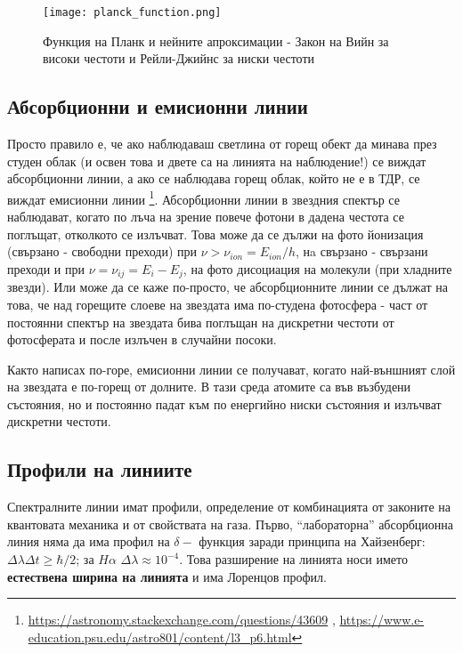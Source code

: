 \documentclass[a4paper,12pt]{article}
\let\oldAA\AA
\renewcommand{\AA}{\text{\normalfont\oldAA}}
\begin{document}
 
\begin{figure}[h!]
\centering
\texttt{[image: planck\_function.png]}
\caption{Функция на Планк и нейните апроксимации - Закон на Вийн за високи честоти и Рейли-Джийнс за ниски честоти}
\label{fig:planck_function}
\end{figure}

 
 \subsection{Абсорбционни и емисионни линии}

Просто правило е, че ако наблюдаваш светлина от горещ обект да минава през студен облак (и освен това и двете са на линията на наблюдение!) се виждат абсорбционни линии, а ако се наблюдава горещ облак, който не е в ТДР, се виждат емисионни линии \footnote{\url{https://astronomy.stackexchange.com/questions/43609} , \url{https://www.e-education.psu.edu/astro801/content/l3_p6.html}}. Абсорбционни линии в звездния спектър се наблюдават, когато по лъча на зрение повече фотони в дадена честота се поглъщат, отколкото се излъчват. Това може да се дължи на фото йонизация (свързано - свободни преходи) при $\nu > \nu_{ion} = E_{ion}/h$, нa свързано - свързани преходи и при $\nu = \nu_{ij}=E_i - E_j$, на фото дисоциация на молекули (при хладните звезди). Или може да се каже по-просто, че абсорбционните линии се дължат на това, че над горещите слоеве на звездата има по-студена фотосфера - част от постоянни спектър на звездата бива поглъщан на дискретни честоти от фотосферата и после излъчен в случайни посоки.

Както написах по-горе, емисионни линии се получават, когато най-външният слой на звездата е по-горещ от долните. В тази среда атомите са във възбудени състояния, но и постоянно падат към по енергийно ниски състояния и излъчват дискретни честоти.

\subsection{Профили на линиите}

 Спектралните линии имат профили, определение от комбинацията от законите на квантовата механика и от свойствата на газа. Първо, ``лабораторна'' абсорбционна линия няма да има профил на $\delta-$ функция заради принципа на Хайзенберг: $\Delta \lambda \Delta t \geq \hbar / 2$;  за $H \alpha$ $\Delta \lambda \approx 10^{-4}$\AA.  Това разширение на линията носи името \textbf{ естествена ширина на линията} и има Лоренцов профил.
\end{document}

